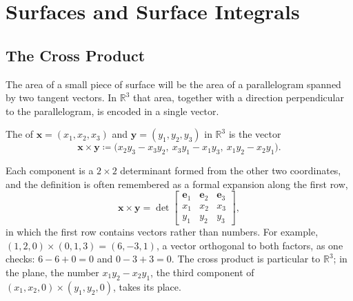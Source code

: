 \section{Surfaces and Surface Integrals}
\label{sec:surfaces}

\subsection{The Cross Product}

The area of a small piece of surface will be the area of a parallelogram spanned by two tangent vectors. In $\mathbb R^3$ that area, together with a direction perpendicular to the parallelogram, is encoded in a single vector.

\begin{definition}
\label{def:cross-product}
The  of $\mathbf x=(x_1,x_2,x_3)$ and $\mathbf y=(y_1,y_2,y_3)$ in $\mathbb R^3$ is the vector
\[
\mathbf x\times\mathbf y\coloneqq\bigl(x_2y_3-x_3y_2,\ x_3y_1-x_1y_3,\ x_1y_2-x_2y_1\bigr).
\]
\end{definition}

Each component is a $2\times2$ determinant formed from the other two coordinates, and the definition is often remembered as a formal expansion along the first row,
\[
\mathbf x\times\mathbf y=\det\begin{bmatrix}\mathbf e_1&\mathbf e_2&\mathbf e_3\\x_1&x_2&x_3\\y_1&y_2&y_3\end{bmatrix},
\]
in which the first row contains vectors rather than numbers. For example, $(1,2,0)\times(0,1,3)=(6,-3,1)$, a vector orthogonal to both factors, as one checks: $6-6+0=0$ and $0-3+3=0$. The cross product is particular to $\mathbb R^3$; in the plane, the number $x_1y_2-x_2y_1$, the third component of $(x_1,x_2,0)\times(y_1,y_2,0)$, takes its place.

